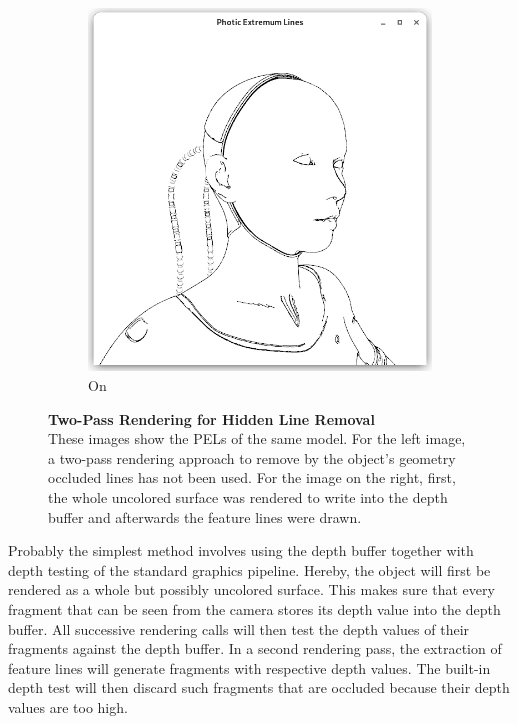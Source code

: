 \documentclass[9pt,fleqn,twoside,twocolumn]{stdglobal}
\begin{document}
\begin{figure}[h]
\begin{subfigure}[b]{0.49\linewidth}
        \includegraphics[width=\textwidth,trim={15px 15 15 50},clip]{images/cyborg-contour-pel-shader.png}
        \caption{On}
      \end{subfigure}
      \caption{%
        \textbf{Two-Pass Rendering for Hidden Line Removal}\\
        These images show the PELs of the same model.
        For the left image, a two-pass rendering approach to remove by the object's geometry occluded lines has not been used.
        For the image on the right, first, the whole uncolored surface was rendered to write into the depth buffer and afterwards the feature lines were drawn.
      }
      \label{fig:hidden-line-removal}
    \end{figure}

    Probably the simplest method involves using the depth buffer together with depth testing of the standard graphics pipeline.
    Hereby, the object will first be rendered as a whole but possibly uncolored surface.
    This makes sure that every fragment that can be seen from the camera stores its depth value into the depth buffer.
    All successive rendering calls will then test the depth values of their fragments against the depth buffer.
    In a second rendering pass, the extraction of feature lines will generate fragments with respective depth values.
    The built-in depth test will then discard such fragments that are occluded because their depth values are too high.
\end{document}
